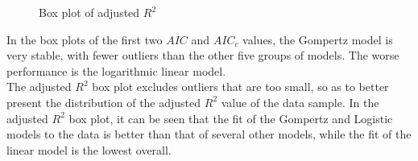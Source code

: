 \documentclass[11pt]{article}
\begin{document}
\begin{figure}[htbp]
\centering
{}
\caption{Box plot of adjusted $R^2$}
\end{figure} 

In the box plots of the first two $AIC$ and $AIC_c$ values, the Gompertz model is very stable, with fewer outliers than the other five groups of models. The worse performance is the logarithmic linear model.\\

The adjusted $R^2$ box plot excludes outliers that are too small, so as to better present the distribution of the adjusted $R^2$ value of the data sample. In the adjusted $R^2$ box plot, it can be seen that the fit of the Gompertz and Logistic models to the data is better than that of several other models, while the fit of the linear model is the lowest overall.
\end{document}
